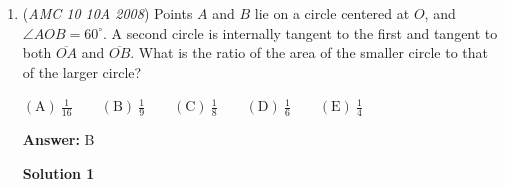 \begin{enumerate}
 Let's look at the third equation. Expanding, we get

 $m=st+10t+2s+20.$

 Since we want $n$ we want the equation $m=d+n$. We write the expanded third equation into this form since $st=d.$
$(5) \phantom{a} m=d+(10t+2s+20)$.

 Let's take a closer look at the $n$ section of the equation:

 $(6) \phantom{a} n=10t+2s+20$

 This looks very similar to equation 4, if you multiply equation 4 by $2$ you get

 $(7) \phantom{a} 10t+2s=130$.

 Plugging equation 7 into equation 6 we have

 $n=(10t+2s)+20 \Rightarrow n=130+20$

 Calculating gets us

 $(8) \phantom{a} n=150.$

 Substituting equation 8 into equation 5 gets us

 $m=d+n \Rightarrow m=d+150.$

 The $n$ term is $150$ which is what we want to find so the answer is $\boxed{\mathrm{(D) 150}}.$




\textbf{Solution 5 (quick solution)}

Since Han drove for $1$ hour and drove $70$ miles more than Ian during that hour, we know that Ian's speed is $65$ miles per hour since Han drove $5$ mph faster than him. Now Jan went $10$ mph faster than Ian for $2$ hours, so we can tell that she drove $75 \cdot 2$ miles more than Ian, therefore the answer is $\boxed{\mathrm{(D) 150}}.$



	\item (\textit{AMC 10 10A 2008}) Points $A$ and $B$ lie on a circle centered at $O$, and $\angle AOB = 60^\circ$. A second circle is internally tangent to the first and tangent to both $\overline{OA}$ and $\overline{OB}$. What is the ratio of the area of the smaller circle to that of the larger circle?


 $\mathrm{(A)}\ \frac{1}{16}\qquad\mathrm{(B)}\ \frac{1}{9}\qquad\mathrm{(C)}\ \frac{1}{8}\qquad\mathrm{(D)}\ \frac{1}{6}\qquad\mathrm{(E)}\ \frac{1}{4}$

 \textbf{Answer: }B



\textbf{Solution 1}



\end{enumerate}

